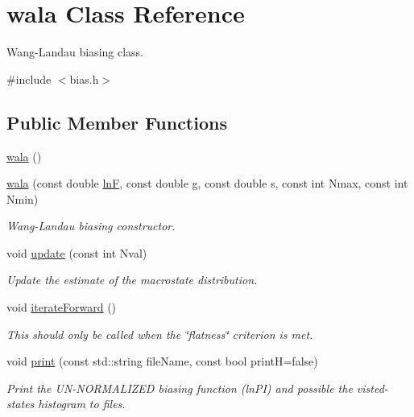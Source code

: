 \hypertarget{classwala}{}\section{wala Class Reference}
\label{classwala}


Wang-\/\+Landau biasing class.  




{\ttfamily \#include $<$bias.\+h$>$}

\subsection*{Public Member Functions}
\begin{DoxyCompactItemize}
\item 
\hyperlink{classwala_a1a4483327eb3527ecc114c075b0b0598}{wala} ()
\item 
\hyperlink{classwala_a6f8890a10284e1551b1603ecc45433e8}{wala} (const double \hyperlink{classwala_acb8e59580d97bc3c5b9b4ff45eb6bb9a}{ln\+F}, const double g, const double s, const int Nmax, const int Nmin)
\begin{DoxyCompactList}\small\item\em Wang-\/\+Landau biasing constructor. \end{DoxyCompactList}\item 
void \hyperlink{classwala_a5eb2622be6a9e89f5e59ba0b15aca4bd}{update} (const int Nval)
\begin{DoxyCompactList}\small\item\em Update the estimate of the macrostate distribution. \end{DoxyCompactList}\item 
void \hyperlink{classwala_ae06c2f1475702ec9d1b0a243b7f34e4b}{iterate\+Forward} ()
\begin{DoxyCompactList}\small\item\em This should only be called when the \char`\"{}flatness\char`\"{} criterion is met. \end{DoxyCompactList}\item 
void \hyperlink{classwala_a65569289fac85d0da9c336e17c9d809a}{print} (const std\+::string file\+Name, const bool print\+H=false)
\begin{DoxyCompactList}\small\item\em Print the U\+N-\/\+N\+O\+R\+M\+A\+L\+I\+Z\+E\+D biasing function (ln\+P\+I) and possible the visted-\/states histogram to files. \end{DoxyCompactList}\item 

\end{DoxyCompactItemize}
